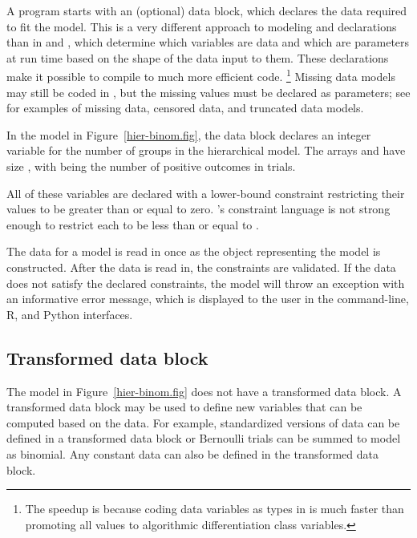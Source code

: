 \documentclass[article]{jss}
\begin{document}
A  program starts with an (optional) data block, which
declares the data required to fit the model.  This is a very different
approach to modeling and declarations than in  and
, which determine which variables are data and which
are parameters at run time based on the shape of the data input to
them.  These declarations make it possible to compile 
to much more efficient code.%
%
\footnote{The speedup is because coding data variables as
   types in  is much faster than promoting
  all values to algorithmic differentiation class variables.}
%
Missing data models may still be coded in , but the
missing values must be declared as parameters; see \citep{Stan:2013}
for examples of missing data, censored data, and truncated data
models.

In the model in Figure~\ref{hier-binom.fig}, the data block declares
an integer variable  for the number of groups in the
hierarchical model.  The arrays  and  have size
, with  being the number of positive outcomes in
 trials.

All of these variables are declared with a lower-bound constraint
restricting their values to be greater than or equal to zero.
's constraint language is not strong enough to restrict
each  to be less than or equal to .

The data for a  model is read in once as the
 object representing the model is constructed.  After
the data is read in, the constraints are validated.  If the data does
not satisfy the declared constraints, the model will throw an
exception with an informative error message, which is displayed to the
user in the command-line, R, and Python interfaces.

\subsection{Transformed data block}

The model in Figure~\ref{hier-binom.fig} does not have a transformed
data block.  A transformed data block may be used to define new
variables that can be computed based on the data.  For example,
standardized versions of data can be defined in a transformed
data block or Bernoulli trials can be summed to model as binomial.
Any constant data can also be defined in the transformed data block.
\end{document}
